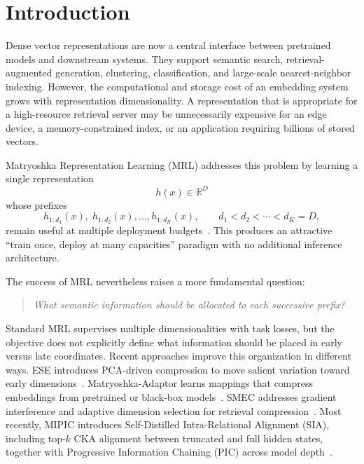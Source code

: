 \documentclass[11pt]{article}
\newcommand{\R}{\mathbb{R}}
\begin{document}
\section{Introduction}

Dense vector representations are now a central interface between pretrained models and downstream systems.
They support semantic search, retrieval-augmented generation, clustering, classification, and large-scale nearest-neighbor indexing.
However, the computational and storage cost of an embedding system grows with representation dimensionality.
A representation that is appropriate for a high-resource retrieval server may be unnecessarily expensive for an edge device, a memory-constrained index, or an application requiring billions of stored vectors.

Matryoshka Representation Learning (MRL) addresses this problem by learning a single representation
\begin{equation}
    h(x) \in \R^D
\end{equation}
whose prefixes
\begin{equation}
    h_{1:d_1}(x),\;
    h_{1:d_2}(x),\ldots,
    h_{1:d_K}(x),
    \qquad
    d_1 < d_2 < \cdots < d_K=D,
\end{equation}
remain useful at multiple deployment budgets~\cite{kusupati2022matryoshka}.
This produces an attractive ``train once, deploy at many capacities'' paradigm with no additional inference architecture.

The success of MRL nevertheless raises a more fundamental question:
\begin{quote}
\emph{What semantic information should be allocated to each successive prefix?}
\end{quote}

Standard MRL supervises multiple dimensionalities with task losses, but the objective does not explicitly define what information should be placed in early versus late coordinates.
Recent approaches improve this organization in different ways.
ESE introduces PCA-driven compression to move salient variation toward early dimensions~\cite{li2025ese}.
Matryoshka-Adaptor learns mappings that compress embeddings from pretrained or black-box models~\cite{yoon2024matryoshka}.
SMEC addresses gradient interference and adaptive dimension selection for retrieval compression~\cite{zhang2025smec}.
Most recently, MIPIC introduces Self-Distilled Intra-Relational Alignment (SIA), including top-$k$ CKA alignment between truncated and full hidden states, together with Progressive Information Chaining (PIC) across model depth~\cite{huy2026mipic}.
\end{document}
